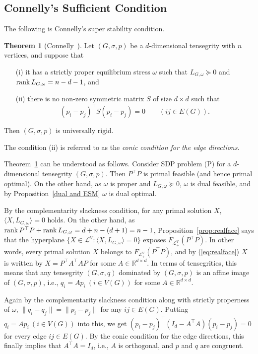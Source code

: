 \documentclass[11pt]{article}
\theoremstyle{definition}
\newtheorem{theorem}{Theorem}
\begin{document}
\subsection{Connelly's Sufficient Condition}
The following is Connelly's super stability condition.
\begin{theorem}[Connelly~\cite{connelly1982rigidity}]\label{thm:connelly}
Let  $(G,\sigma,p)$ be  a $d$-dimensional tensegrity  with $n$ vertices, and suppose that 
\begin{itemize}
\item[(i)]  it has a strictly proper equilibrium stress $\omega$ such that 
$L_{G,\omega}\succeq 0$ and $\rank L_{G,\omega}=n-d-1$, and 
\item[(ii)]  there is no non-zero symmetric matrix $S$ of size $d\times d$ such that 
\[
(p_i-p_j)^{\top} S(p_i-p_j)=0\qquad (ij\in E(G)).
\]
\end{itemize}
Then $(G,\sigma,p)$ is universally rigid.
\end{theorem}
The condition (ii)  is referred to as the {\em conic condition for the edge directions}. 

Theorem~\ref{thm:connelly} can be understood as follows.
Consider SDP problem (P) for a $d$-dimensional tensegrity $(G,\sigma, p)$.
Then $P^{\top}P$ is primal feasible (and hence primal optimal).
On the other hand, as $\omega$ is proper and $L_{G,\omega}\succeq 0$, 
$\omega$ is dual feasible, and  by Proposition~\ref{dual and ESM} $\omega$ is dual optimal. 

By the complementarity slackness condition, for any primal solution $X$, 
$\langle X, L_{G,\omega}\rangle=0$ holds. 
On the other hand, as  $\rank P^{\top}P +\rank L_{G,\omega}=d+n-(d+1)= n-1$, 
Proposition~\ref{prop:realface} says that 
the hyperplane $\{X\in \mathcal{L}^V: \langle X, L_{G,\omega}\rangle=0\}$  exposes $F_{\mathcal{L}_+^V}(P^{\top}P)$.
In other words, every  primal solution $X$ belongs to $F_{\mathcal{L}_+^V}(P^{\top}P)$, 
and by (\ref{eq:realface}) $X$ is written by $X=P^{\top}A^{\top}AP$ for some $A\in \mathbb{R}^{d\times d}$.
In terms of tensegrities, this means that  any tensegrity $(G,\sigma, q)$ dominated by $(G,\sigma,p)$ is an affine image of $(G,\sigma, p)$, i.e., 
$q_i=Ap_i\ (i\in V(G))$ for some $A\in \mathbb{R}^{d\times d}$.

Again by the complementarity slackness condition along with strictly properness of $\omega$, 
$\|q_i-q_j\|=\|p_i-p_j\|$ for any $ij\in E(G)$. Putting $q_i=Ap_i\ (i\in V(G))$  into this, 
we get $(p_i-p_j)^{\top} (I_d-A^{\top}A)(p_i- p_j)=0$ for every edge $ij\in E(G)$. 
By the conic condition for the edge directions, this finally implies that $A^{\top}A=I_d$, i.e.,  $A$ is orthogonal, and  $p$ and  $q$ are congruent.
\fi
\end{document}
